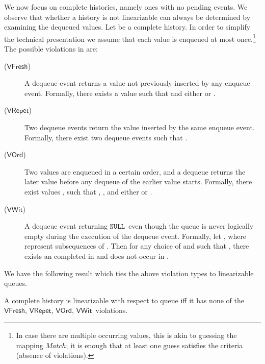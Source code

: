 \documentclass{LMCS}
\newcommand{\NULL}{\ensuremath{\mathtt{NULL}}}
\newcommand{\Match}{\ensuremath{\mathit{Match}}}
\newcommand\mylabel[1]{\label{#1}}
\newcommand{\VFresh}{\ensuremath{\mathsf{VFresh}}}
\newcommand{\VRepet}{\ensuremath{\mathsf{VRepet}}}
\newcommand{\VOrd}{\ensuremath{\mathsf{VOrd}}}
\newcommand{\VWit}{\ensuremath{\mathsf{VWit}}}
\begin{document}
We now focus on complete histories, namely ones with no pending events. 
We observe that whether a history is not linearizable can always be determined by examining the dequeued values. 
Let  be a complete history.
In order to simplify the technical presentation we assume that each value is enqueued at most once.\footnote{In case there are multiple occurring values, this is akin to guessing the mapping {\Match}; it is enough that at least one guess satisfies the criteria (absence of violations).}
The possible violations in  are: 
\begin{description}
\item[(\VFresh)] A dequeue event returns a value not previously inserted by any enqueue event.
Formally, there exists a value  such that  and either  or .
\item[(\VRepet)] Two dequeue events return the value inserted by the same enqueue event.
Formally, there exist two dequeue events  such that .
\item[(\VOrd)]
Two values are enqueued in a certain order, and a dequeue returns the later value before any dequeue of the earlier value starts.
Formally, there exist values ,  such that , , and either  or .
\item[(\VWit)] A dequeue event returning \NULL\ even though the queue is never logically empty during the execution of the dequeue event.
Formally, let , where  represent subsequences of .
Then for any choice of  and  such that , there exists an  completed in  and  does not occur in .
\end{description}\smallskip

\noindent We have the following result which ties the above violation types to linearizable queues.

\begin{prop}\mylabel{prop:compl-viol}
A complete history  is linearizable with respect to queue iff it has none of the \VFresh, \VRepet, \VOrd, \VWit\ violations.
\end{prop}
\end{document}
